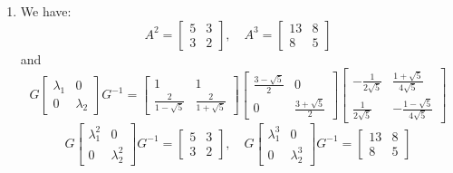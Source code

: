 \begin{enumerate}
    \item We have: 
    \[A^2 = 
    \begin{bmatrix}
    5 & 3 \\
    3 & 2
    \end{bmatrix}, \quad A^3 = 
    \begin{bmatrix}
   13 & 8 \\
    8 & 5
    \end{bmatrix}\] and 
    \[G
    \begin{bmatrix}
    \lambda_{1} & 0 \\
    0 & \lambda_{2}
    \end{bmatrix}
    G^{-1} = 
    \begin{bmatrix}
    1 & 1 \\ 
    \frac{2}{1 - \sqrt{5}} & \frac{2}{1 + \sqrt{5}}  
    \end{bmatrix} \begin{bmatrix}
    \frac{3- \sqrt{5}}{2} & 0  \\
    0 & \frac{3+ \sqrt{5}}{2}  
    \end{bmatrix}
    \begin{bmatrix}
    -\frac{1}{2 \sqrt{5}} & \frac{1+\sqrt{5}}{4 \sqrt{5}}\\
    \frac{1}{2 \sqrt{5}} & -\frac{1-\sqrt{5}}{4 \sqrt{5}} 
    \end{bmatrix}\]
    \[ G \begin{bmatrix}
    \lambda_{1}^2 & 0 \\
    0 & \lambda_{2}^2
    \end{bmatrix}
    G^{-1} = 
    \begin{bmatrix}
    5 & 3 \\
    3 & 2
    \end{bmatrix},
    \quad  
    G \begin{bmatrix}
    \lambda_{1}^3 & 0 \\
    0 & \lambda_{2}^3
    \end{bmatrix}
    G^{-1} =
    \begin{bmatrix}
   13 & 8 \\
    8 & 5 
    \end{bmatrix}
     \]
    
    
    
    
    
    
    
\end{enumerate}


